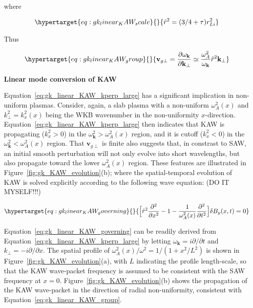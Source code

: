 \documentclass[
  notoc %
]{tufte-book}
\begin{document}
where

\begin{equation}\protect\hypertarget{eq:gk_linear_KAW_scale}{}{
\hat{r}^2 = (3/4 + \tau)r_{Li}^2
}\label{eq:gk_linear_KAW_scale}\end{equation}

Thus

\begin{equation}\protect\hypertarget{eq:gk_linear_KAW_group}{}{
\mathbf{v}_{g\perp}=\frac{\partial \omega_\mathbf{k}}{\partial \mathbf{k}_\perp}\simeq \frac{\omega_A^2}{\omega_\mathbf{k}}\hat{r}^2\mathbf{k}_\perp
}\label{eq:gk_linear_KAW_group}\end{equation}

\textbf{Linear mode conversion of KAW}

Equation~\ref{eq:gk_linear_KAW_kperp_large} has a significant
implication in non-uniform plasmas. Consider, again, a slab plasma with
a non-uniform \(\omega_A^2(x)\) and \(k_\perp^2 = k_x^2(x)\) being the
WKB wavenumber in the non-uniformity \(x\)-direction.
Equation~\ref{eq:gk_linear_KAW_kperp_large} then indicates that KAW is
propagating (\(k_x^2>0\)) in the \(\omega_\mathbf{k}^2>\omega_A^2(x)\)
region, and it is cutoff (\(k_x^2<0\)) in the
\(\omega_\mathbf{k}^2<\omega_A^2(x)\) region. That
\(\mathbf{v}_{g\perp}\) is finite also suggests that, in constrast to
SAW, an initial smooth perturbation will not only evolve into short
wavelengths, but also propagate toward the lower \(\omega_A^2(x)\)
region. These features are illustrated in
Figure~\ref{fig:gk_KAW_evolution}(b); where the spatial-temporal
evolution of KAW is solved explicitly according to the following wave
equation: (DO IT MYSELF!!!)

\begin{equation}\protect\hypertarget{eq:gk_linear_KAW_governing}{}{
\Big[ \hat{r}^2\frac{\partial^2}{\partial x^2} - 1 - \frac{1}{\omega_A^2(x)}\frac{\partial^2}{\partial t^2} \Big] \delta B_y(x,t) = 0
}\label{eq:gk_linear_KAW_governing}\end{equation}

Equation~\ref{eq:gk_linear_KAW_governing} can be readily derived from
Equation~\ref{eq:gk_linear_KAW_kperp_large} by letting
\(\omega_\mathbf{k}=i\partial/\partial t\) and
\(k_\perp=-i\partial/\partial x\). The spatial profile of
\(\omega_A^2(x)/\omega^2 = 1/(1+x^2/L^2)\) is shown in
Figure~\ref{fig:gk_KAW_evolution}(a), with \(L\) indicating the profile
length-scale, so that the KAW wave-packet frequency is assumed to be
consistent with the SAW frequency at \(x=0\).
Figure~\ref{fig:gk_KAW_evolution}(b) shows the propagation of the KAW
wave-packet in the direction of radial non-uniformity, consistent with
Equation~\ref{eq:gk_linear_KAW_group}.
\end{document}
